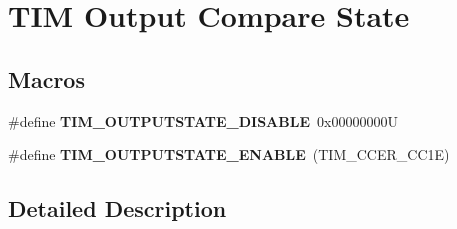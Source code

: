 \hypertarget{group___t_i_m___output___compare___state}{}\section{T\+IM Output Compare State}
\label{group___t_i_m___output___compare___state}
\subsection*{Macros}
\begin{DoxyCompactItemize}
\item 
\mbox{\label{group___t_i_m___output___compare___state_ga98fa585adffeb0d3654b47040576c6b7}} 
\#define {\bfseries T\+I\+M\+\_\+\+O\+U\+T\+P\+U\+T\+S\+T\+A\+T\+E\+\_\+\+D\+I\+S\+A\+B\+LE}~0x00000000U
\item 
\mbox{\label{group___t_i_m___output___compare___state_ga114555abc521311f689478a7e0a9ace9}} 
\#define {\bfseries T\+I\+M\+\_\+\+O\+U\+T\+P\+U\+T\+S\+T\+A\+T\+E\+\_\+\+E\+N\+A\+B\+LE}~(T\+I\+M\+\_\+\+C\+C\+E\+R\+\_\+\+C\+C1E)
\end{DoxyCompactItemize}


\subsection{Detailed Description}
